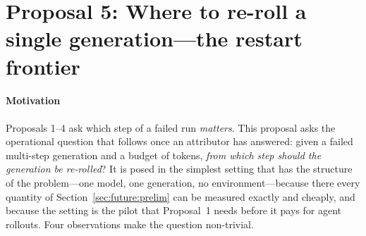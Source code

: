 \documentclass[10pt,a4paper]{article}
\begin{document}

\section{Proposal 5: Where to re-roll a single generation---the restart frontier}\label{sec:future:reroll}

\paragraph{Motivation} Proposals 1--4 ask which step of a failed run \emph{matters}. This proposal asks the operational question that follows once an attributor has answered: given a failed multi-step generation and a budget of tokens, \emph{from which step should the generation be re-rolled}? It is posed in the simplest setting that has the structure of the problem---one model, one generation, no environment---because there every quantity of Section~\ref{sec:future:prelim} can be measured exactly and cheaply, and because the setting is the pilot that Proposal~1 needs before it pays for agent rollouts. Four observations make the question non-trivial.
\end{document}
